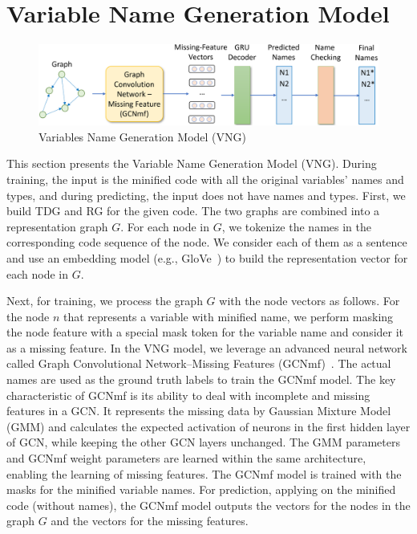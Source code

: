 \section{Variable Name Generation Model}
\label{sec:name-gen}

\begin{figure}[h]
	\begin{center}
	  \includegraphics[width=4.8in]{figures/name-gen-model-2}
          \vspace{-6pt}
		\caption{Variables Name Generation Model (VNG)}
		\label{fig:name-gen}
	\end{center}
\end{figure}


This section presents the Variable Name Generation Model (VNG).
During training, the input is the minified code with all the original
variables' names and types, and during predicting, the input does not
have names and types. First, we build TDG and RG for the given
code. The two graphs are combined into a representation
graph $G$. For each node in $G$, we tokenize the names in the
corresponding code sequence of the node. We consider each of them as a
sentence and use an embedding model (e.g.,
GloVe~\cite{pennington2014glove}) to build the representation vector
for each node in $G$.

Next, for training, we process the graph $G$ with the node vectors as
follows. For the node $n$ that represents a variable with minified
name, we perform masking the node feature with a special mask token
for the variable name and consider it as a missing feature. In the VNG
model, we leverage an advanced neural network called Graph
Convolutional Network--Missing Features (GCNmf)~\cite{GCNmf}.  The
actual names are used as the ground truth labels to train the GCNmf
model. The key characteristic of GCNmf is its ability to deal with
incomplete and missing features in a GCN. It represents the missing
data by Gaussian Mixture Model (GMM) and calculates the expected
activation of neurons in the first hidden layer of GCN, while keeping
the other GCN layers unchanged. The GMM parameters and GCNmf weight
parameters are learned within the same architecture, enabling the
learning of missing features. The GCNmf model is trained with the
masks for the minified variable names. For prediction, applying on the
minified code (without names), the GCNmf model outputs the vectors for
the nodes in the graph $G$ and the vectors for the missing features.

